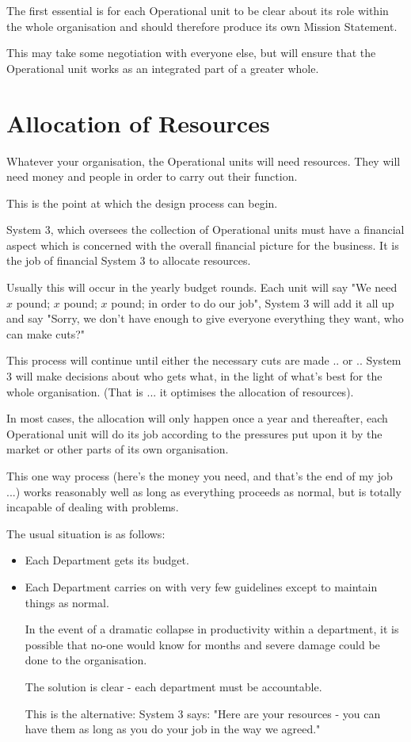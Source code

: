 The first essential is for each Operational unit to be clear about its role within the whole organisation and should therefore produce its own Mission Statement.

This may take some negotiation with everyone else, but will ensure that the Operational unit works as an integrated part of a greater whole.


\section*{Allocation of Resources}
Whatever your organisation, the Operational units will need resources. They will need money and people in order to carry out their function.

This is the point at which the design process can begin.

System 3, which oversees the collection of Operational units must have a financial aspect which is concerned with the overall financial picture for the business. It is the job of financial System 3 to allocate resources.

Usually this will occur in the yearly budget rounds. Each unit will say "We need $x$ pound; $x$ pound; $x$ pound; in order to do our job", System 3 will add it all up and say "Sorry, we don't have enough to give everyone everything they want, who can make cuts?"

This process will continue until either the necessary cuts are made .. or .. System 3 will make decisions about who gets what, in the light of what's best for the whole organisation. (That is ... it optimises the allocation of resources).

In most cases, the allocation will only happen once a year and thereafter, each Operational unit will do its job according to the pressures put upon it by the market or other parts of its own organisation.

This one way process (here's the money you need, and that's the end of my job ...) works reasonably well as long as everything proceeds as normal, but is totally incapable of dealing with problems.

The usual situation is as follows:

\begin{itemize}
  \item Each Department gets its budget.

  \item Each Department carries on with very few guidelines except to maintain things as normal.

In the event of a dramatic collapse in productivity within a department, it is possible that no-one would know for months and severe damage could be done to the organisation.

The solution is clear - each department must be accountable.

This is the alternative: System 3 says: "Here are your resources - you can have them as long as you do your job in the way we agreed."

\end{itemize}

